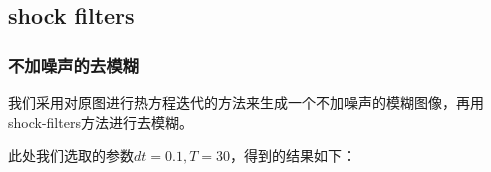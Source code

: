 \documentclass[a4paper,  11pt]{ctexart}
\begin{document}
\subsection{shock filters}
\subsubsection{不加噪声的去模糊}
我们采用对原图进行热方程迭代的方法来生成一个不加噪声的模糊图像，再用
shock-filters方法进行去模糊。\par
此处我们选取的参数$dt=0.1,T=30$，得到的结果如下：
\begin{figure}[H]
    \centering

\end{figure}
\end{document}
